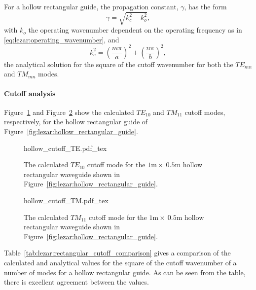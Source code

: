 For a hollow rectangular guide, the propagation constant, $\gamma$, has the form
\begin{equation}
 \label{eq:lezar:rectangular_propagation}
 \gamma = \sqrt{k_c^2 - k_o^2},
\end{equation}
with $k_o$ the operating wavenumber dependent on the operating frequency as in \eqref{eq:lezar:operating_wavenumber}, and
\begin{equation}
 \label{eq:lezar:rectangular_cutoff}
 k_c^2 = \left(\frac{m\pi}{a}\right)^2 + \left(\frac{n\pi}{b}\right)^2,
\end{equation}
the analytical solution for the square of the cutoff wavenumber for both the $TE_{mn}$ and $TM_{mn}$ modes.

\paragraph{Cutoff analysis}

Figure~\ref{fig:lezar:rectangular_cutoff_TE} and Figure~\ref{fig:lezar:rectangular_cutoff_TM} show the calculated $TE_{10}$ and $TM_{11}$ cutoff modes, respectively, for the hollow rectangular guide of Figure~\ref{fig:lezar:hollow_rectangular_guide}.
\begin{figure}[ht]
\centering
    \def\svgwidth{\smallfig}
    {hollow_cutoff_TE.pdf_tex}
\caption{The calculated $TE_{10}$ cutoff mode for the $1\text{m}\times~0.5\text{m}$ hollow rectangular waveguide shown in Figure~\ref{fig:lezar:hollow_rectangular_guide}.}
\label{fig:lezar:rectangular_cutoff_TE}
\end{figure}

\begin{figure}[ht]
\centering
  \def\svgwidth{\smallfig}
    {hollow_cutoff_TM.pdf_tex}
\caption{The calculated $TM_{11}$ cutoff mode for the $1\text{m}\times~0.5\text{m}$ hollow rectangular waveguide shown in Figure~\ref{fig:lezar:hollow_rectangular_guide}.}
\label{fig:lezar:rectangular_cutoff_TM}
\end{figure}
Table~\ref{tab:lezar:rectangular_cutoff_comparison} gives a comparison of the calculated and analytical values for the square of the cutoff wavenumber of a number of modes for a hollow rectangular guide. As can be seen from the table, there is excellent agreement between the values.

